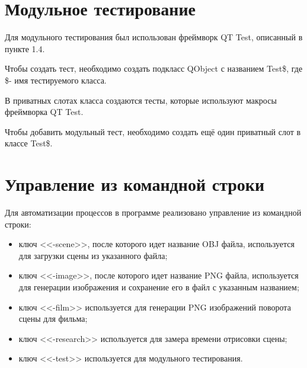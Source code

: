 \section{Модульное тестирование}

Для модульного тестирования был использован фреймворк QT Test, описанный в пункте 1.4.

Чтобы создать тест, необходимо создать подкласс QObject с названием Test\$, где \$- имя тестируемого класса. 




В приватных слотах класса создаются тесты, которые используют макросы фреймворка QT Test.



Чтобы добавить модульный тест, необходимо создать ещё один приватный слот в классе Test\$.

\newpage
\section{Управление из командной строки}

Для автоматизации процессов в программе реализовано управление из командной строки:
\begin{itemize}
	\item ключ <<-scene>>, после которого идет название OBJ файла, используется для загрузки сцены из указанного файла;
	\item ключ <<-image>>, после которого идет название PNG файла, используется для генерации изображения и сохранение его в файл с указанным названием;
	\item ключ <<-film>> используется для генерации PNG изображений поворота сцены для фильма;
	\item ключ <<-research>> используется для замера времени отрисовки сцены;
	\item ключ <<-test>> используется для модульного тестирования.
\end{itemize}


